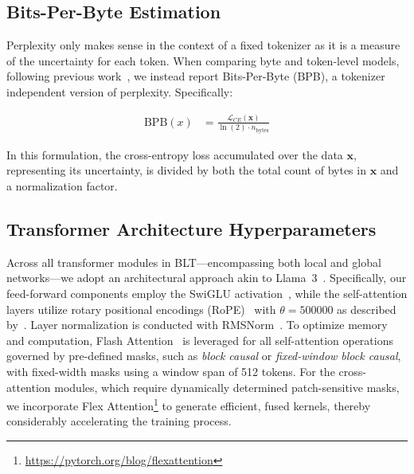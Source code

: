 \subsection{Bits-Per-Byte Estimation} Perplexity only makes sense in the context of a fixed tokenizer as it is a measure of the uncertainty for each token. When comparing byte and token-level models, following previous work~\citep{xue2022byt5, yu2023megabyte, wang2024mambabyte}, we instead report Bits-Per-Byte (BPB), a tokenizer independent version of perplexity. Specifically:

\begin{align}
    \text{BPB}(x)&= \frac{\mathcal{L}_{CE}(\pmb{x})}{\ln(2)\cdot n_{\text{bytes}}}
\end{align}

In this formulation, the cross-entropy loss accumulated over the data $\pmb{x}$, representing its uncertainty, is divided by both the total count of bytes in $\pmb{x}$ and a normalization factor.

\subsection{Transformer Architecture Hyperparameters} 

Across all transformer modules in {\textsc BLT}—encompassing both local and global networks—we adopt an architectural approach akin to Llama~3~\citep{dubey2024llama}. Specifically, our feed-forward components employ the SwiGLU activation~\citep{swiglu}, while the self-attention layers utilize rotary positional encodings (RoPE)~\citep{RoPe} with $\theta=500000$ as described by~\citep{xiong2024effective}. Layer normalization is conducted with RMSNorm~\citep{RMSNorm}. To optimize memory and computation, Flash Attention~\citep{dao2022flashattention} is leveraged for all self-attention operations governed by pre-defined masks, such as \textit{block causal} or \textit{fixed-window block causal}, with fixed-width masks using a window span of 512 tokens. For the cross-attention modules, which require dynamically determined patch-sensitive masks, we incorporate Flex Attention\footnote{\url{https://pytorch.org/blog/flexattention}} to generate efficient, fused kernels, thereby considerably accelerating the training process.

